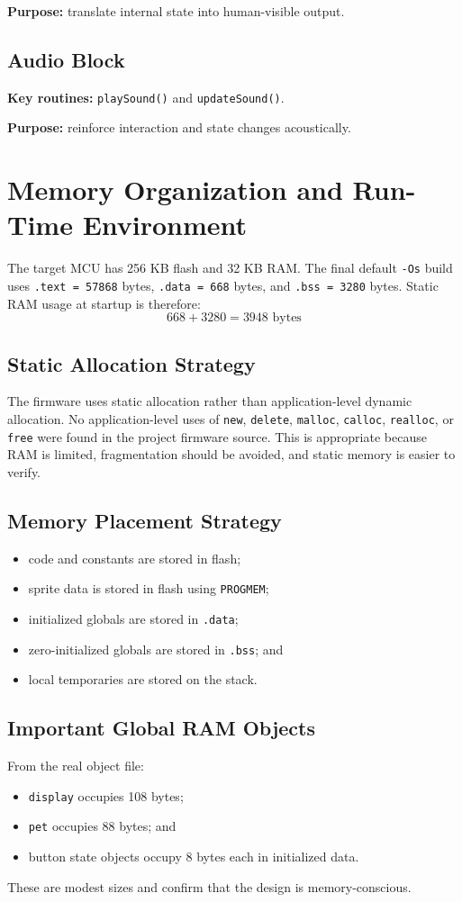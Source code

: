 \documentclass[conference]{IEEEtran}
\begin{document}
\textbf{Purpose:} translate internal state into human-visible output.

\subsection{Audio Block}
\textbf{Key routines:} \texttt{playSound()} and \texttt{updateSound()}.

\textbf{Purpose:} reinforce interaction and state changes acoustically.

\section{Memory Organization and Run-Time Environment}
The target MCU has 256 KB flash and 32 KB RAM. The final default \texttt{-Os} build uses \texttt{.text = 57868} bytes, \texttt{.data = 668} bytes, and \texttt{.bss = 3280} bytes. Static RAM usage at startup is therefore:
\[
668 + 3280 = 3948 \text{ bytes}
\]

\subsection{Static Allocation Strategy}
The firmware uses static allocation rather than application-level dynamic allocation. No application-level uses of \texttt{new}, \texttt{delete}, \texttt{malloc}, \texttt{calloc}, \texttt{realloc}, or \texttt{free} were found in the project firmware source. This is appropriate because RAM is limited, fragmentation should be avoided, and static memory is easier to verify.

\subsection{Memory Placement Strategy}
\begin{itemize}
\item code and constants are stored in flash;
\item sprite data is stored in flash using \texttt{PROGMEM};
\item initialized globals are stored in \texttt{.data};
\item zero-initialized globals are stored in \texttt{.bss}; and
\item local temporaries are stored on the stack.
\end{itemize}

\subsection{Important Global RAM Objects}
From the real object file:
\begin{itemize}
\item \texttt{display} occupies 108 bytes;
\item \texttt{pet} occupies 88 bytes; and
\item button state objects occupy 8 bytes each in initialized data.
\end{itemize}
These are modest sizes and confirm that the design is memory-conscious.
\end{document}
